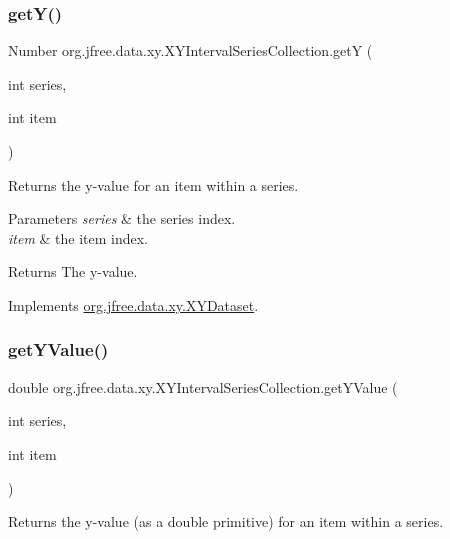 \subsubsection{\texorpdfstring{get\+Y()}{getY()}}
{\footnotesize\ttfamily Number org.\+jfree.\+data.\+xy.\+X\+Y\+Interval\+Series\+Collection.\+getY (\begin{DoxyParamCaption}\item[{int}]{series,  }\item[{int}]{item }\end{DoxyParamCaption})}

Returns the y-\/value for an item within a series.


\begin{DoxyParams}{Parameters}
{\em series} & the series index. \\
\hline
{\em item} & the item index.\\
\hline
\end{DoxyParams}
\begin{DoxyReturn}{Returns}
The y-\/value. 
\end{DoxyReturn}


Implements \mbox{\hyperlink{interfaceorg_1_1jfree_1_1data_1_1xy_1_1_x_y_dataset_aa915867221e0f94021bad3140db5254e}{org.\+jfree.\+data.\+xy.\+X\+Y\+Dataset}}.

\mbox{\label{classorg_1_1jfree_1_1data_1_1xy_1_1_x_y_interval_series_collection_a2dbffee80faab6bf16da287aecd32685}} 
\subsubsection{\texorpdfstring{get\+Y\+Value()}{getYValue()}}
{\footnotesize\ttfamily double org.\+jfree.\+data.\+xy.\+X\+Y\+Interval\+Series\+Collection.\+get\+Y\+Value (\begin{DoxyParamCaption}\item[{int}]{series,  }\item[{int}]{item }\end{DoxyParamCaption})}

Returns the y-\/value (as a double primitive) for an item within a series.


